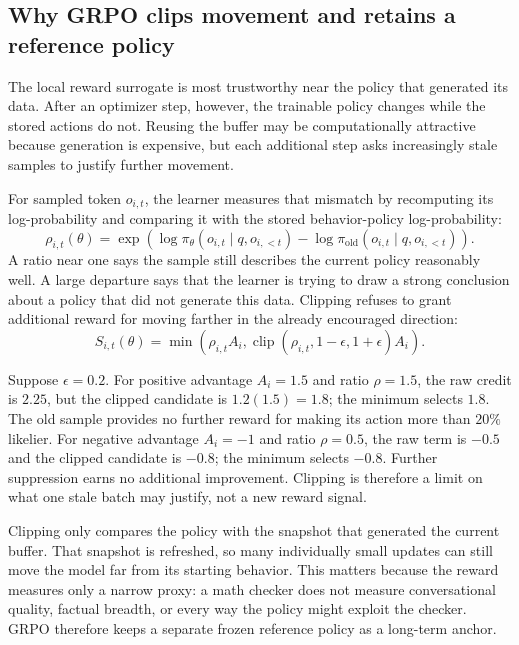 \subsection{Why GRPO clips movement and retains a reference policy}
\label{subsec:grpo-clipped-objective}

The local reward surrogate is most trustworthy near the policy that generated its data.
After an optimizer step, however, the trainable policy changes while the stored actions do
not. Reusing the buffer may be computationally attractive because generation is expensive,
but each additional step asks increasingly stale samples to justify further movement.

For sampled token $o_{i,t}$, the learner measures that mismatch by recomputing its
log-probability and comparing it with the stored behavior-policy log-probability:
\begin{equation}
  \rho_{i,t}(\theta)
  =\exp\!\left(
      \log\pi_\theta(o_{i,t}\mid q,o_{i,<t})
      -\log\pi_{\mathrm{old}}(o_{i,t}\mid q,o_{i,<t})
    \right).
  \label{eq:grpo-token-ratio}
\end{equation}
A ratio near one says the sample still describes the current policy reasonably well. A
large departure says that the learner is trying to draw a strong conclusion about a
policy that did not generate this data. Clipping refuses to grant additional reward for
moving farther in the already encouraged direction:
\begin{equation}
  S_{i,t}(\theta)
  =\min\!\left(
      \rho_{i,t}A_i,
      \operatorname{clip}(\rho_{i,t},1-\epsilon,1+\epsilon)A_i
    \right).
  \label{eq:grpo-clipped-surrogate}
\end{equation}

Suppose $\epsilon=0.2$. For positive advantage $A_i=1.5$ and ratio $\rho=1.5$, the raw
credit is $2.25$, but the clipped candidate is $1.2(1.5)=1.8$; the minimum selects $1.8$.
The old sample provides no further reward for making its action more than $20\%$ likelier.
For negative advantage $A_i=-1$ and ratio $\rho=0.5$, the raw term is $-0.5$ and the
clipped candidate is $-0.8$; the minimum selects $-0.8$. Further suppression earns no
additional improvement. Clipping is therefore a limit on what one stale batch may justify,
not a new reward signal.

Clipping only compares the policy with the snapshot that generated the current buffer.
That snapshot is refreshed, so many individually small updates can still move the model
far from its starting behavior. This matters because the reward measures only a narrow
proxy: a math checker does not measure conversational quality, factual breadth, or every
way the policy might exploit the checker. GRPO therefore keeps a separate frozen reference
policy as a long-term anchor.

